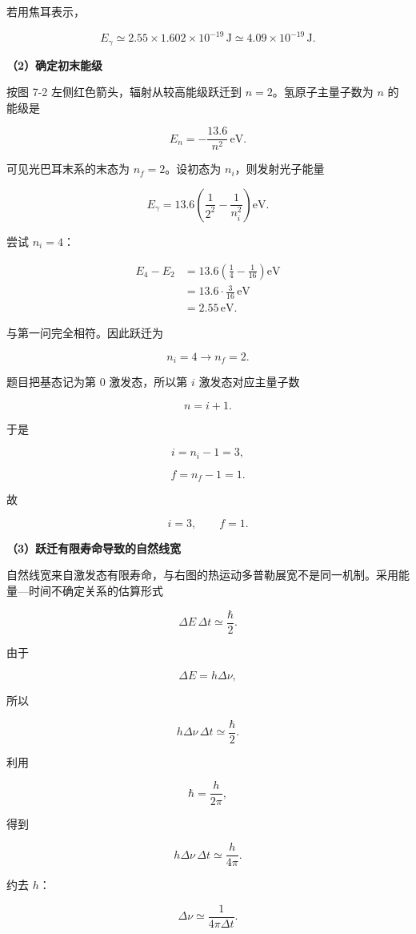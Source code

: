 \documentclass[12pt,a4paper,UTF8]{ctexart}
\begin{document}
若用焦耳表示，

\[
E_\gamma\simeq2.55\times1.602\times10^{-19}\,\mathrm{J}
\simeq4.09\times10^{-19}\,\mathrm{J}.
\]

\textbf{（2）确定初末能级}

按图 7-2 左侧红色箭头，辐射从较高能级跃迁到 \(n=2\)。氢原子主量子数为
\(n\) 的能级是

\[
E_n=-\frac{13.6}{n^2}\,\mathrm{eV}.
\]

可见光巴耳末系的末态为 \(n_f=2\)。设初态为 \(n_i\)，则发射光子能量

\[
E_\gamma=13.6\left(\frac1{2^2}-\frac1{n_i^2}\right)\mathrm{eV}.
\]

尝试 \(n_i=4\)：

\[
\begin{aligned}
E_4-E_2
&=13.6\left(\frac14-\frac1{16}\right)\mathrm{eV}\\
&=13.6\cdot\frac3{16}\,\mathrm{eV}\\
&=2.55\,\mathrm{eV}.
\end{aligned}
\]

与第一问完全相符。因此跃迁为

\[
\boxed{n_i=4\to n_f=2}.
\]

题目把基态记为第 \(0\) 激发态，所以第 \(i\) 激发态对应主量子数

\[n=i+1.\]

于是

\[i=n_i-1=3,\]

\[f=n_f-1=1.\]

故

\[
\boxed{i=3,\qquad f=1}.
\]

\textbf{（3）跃迁有限寿命导致的自然线宽}

自然线宽来自激发态有限寿命，与右图的热运动多普勒展宽不是同一机制。采用能量---时间不确定关系的估算形式

\[
\Delta E\,\Delta t\simeq\frac{\hbar}{2}.
\]

由于

\[
\Delta E=h\Delta\nu,
\]

所以

\[
h\Delta\nu\,\Delta t\simeq\frac{\hbar}{2}.
\]

利用

\[\hbar=\frac{h}{2\pi},\]

得到

\[
h\Delta\nu\,\Delta t\simeq\frac{h}{4\pi}.
\]

约去 \(h\)：

\[
\Delta\nu\simeq\frac{1}{4\pi\Delta t}.
\]
\end{document}
